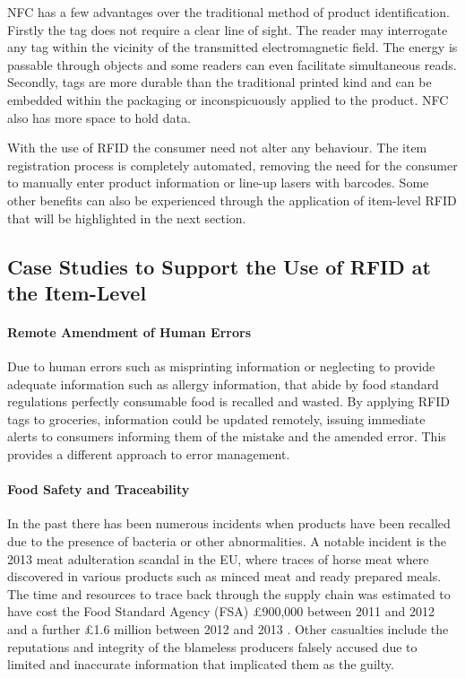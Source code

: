 \documentclass[a4paper, 11pt]{article}
\begin{document}
NFC has a few advantages over the traditional method of product identification. Firstly the tag does not require a clear line of sight. The reader may interrogate any tag within the vicinity of the transmitted electromagnetic field. The energy is passable through objects and some readers can even facilitate simultaneous reads. Secondly, tags are more durable than the traditional printed kind and can be embedded within the packaging or inconspicuously applied to the product. NFC also has more space to hold data.

With the use of RFID the consumer need not alter any behaviour. The item registration process is completely automated, removing the need for the consumer to manually enter product information or line-up lasers with barcodes. Some other benefits can also be experienced through the application of item-level RFID that will be highlighted in the next section.


\subsection{Case Studies to Support the Use of RFID at the Item-Level}

\paragraph{Remote Amendment of Human Errors}
Due to human errors such as misprinting information or neglecting to provide adequate information such as allergy information, that abide by food standard regulations perfectly consumable food is recalled and wasted.\cite{FDA} By applying RFID tags to groceries, information could be updated remotely, issuing immediate alerts to consumers informing them of the mistake and the amended error. This provides a different approach to error management.

\paragraph{Food Safety and Traceability}
In the past there has been numerous incidents when products have been recalled due to the presence of bacteria or other abnormalities. A notable incident is the 2013 meat adulteration scandal in the EU, where traces of horse meat where discovered in various products such as minced meat and ready prepared meals. The time and resources to trace back through the supply chain was estimated to have cost the Food Standard Agency (FSA) \pounds900,000 between 2011 and 2012 and a further \pounds1.6 million between 2012 and 2013 \cite{FSA}. Other casualties include the reputations and integrity of the blameless producers falsely accused due to limited and inaccurate information that implicated them as the guilty.\cite{horsy}
\end{document}
